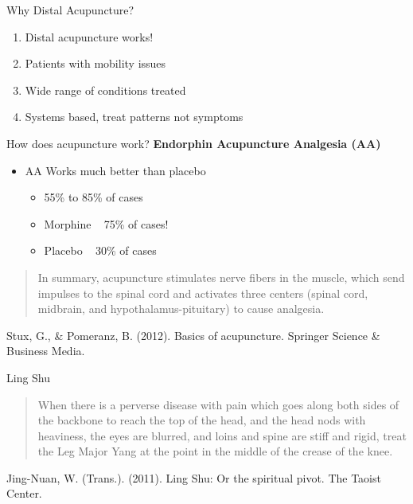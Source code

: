 \begin{frame}{Why Distal Acupuncture?} %
  \begin{center}
    \pause
    \begin{enumerate}
    \item \LARGE Distal acupuncture works!
      \pause
    \item \LARGE Patients with mobility issues
      \pause
    \item \LARGE Wide range of conditions treated
      \pause
    \item \LARGE Systems based, treat patterns not symptoms
    \end{enumerate}
  \end{center}
\end{frame}

\begin{frame}{How does acupuncture work?} %
  \textbf{\Large Endorphin Acupuncture Analgesia (AA)}
  \begin{itemize}
  \item AA Works much better than placebo
    \begin{itemize}
    \item 55\% to 85\% of cases
    \item Morphine ~ 75\% of cases!
    \item Placebo ~ 30\% of cases
    \end{itemize}
  \end{itemize}
  \begin{quote}
    In summary, acupuncture stimulates nerve fibers in the muscle, which send impulses to the spinal cord and activates three centers (spinal cord, midbrain, and hypothalamus-pituitary) to cause analgesia.
  \end{quote}

  Stux, G., \& Pomeranz, B. (2012). Basics of acupuncture. Springer Science \& Business Media. 
  
\end{frame}

\begin{frame}{Ling Shu} %
  \begin{quote}
    When there is a perverse disease with pain which goes along both sides of the backbone to reach the top of the head, and the head nods with heaviness, the eyes are blurred, and loins and spine are stiff and rigid, treat the Leg Major Yang at the point in the middle of the crease of the knee.
  \end{quote}

  Jing-Nuan, W. (Trans.). (2011). Ling Shu: Or the spiritual pivot. The Taoist Center.
\end{frame}

